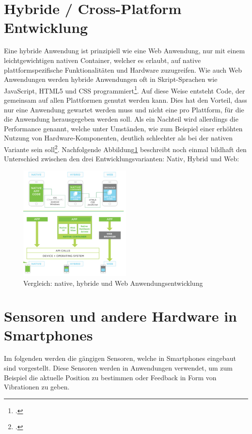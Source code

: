 \section{Hybride / Cross-Platform Entwicklung}

Eine hybride Anwendung ist prinzipiell wie eine Web Anwendung, nur mit einem leichtgewichtigen nativen Container, welcher es erlaubt, auf native plattformspezifische Funktionalitäten und Hardware zuzugreifen. Wie auch Web Anwendungen werden hybride Anwendungen oft in Skript-Sprachen wie JavaScript, HTML5 und CSS programmiert\footcite{Varianten}. Auf diese Weise entsteht Code, der gemeinsam auf allen Plattformen genutzt werden kann. Dies hat den Vorteil, dass nur eine Anwendung gewartet werden muss und nicht eine pro Plattform, für die die Anwendung herausgegeben werden soll. Als ein Nachteil wird allerdings die Performance genannt, welche unter Umständen, wie zum Beispiel einer erhöhten Nutzung von Hardware-Komponenten, deutlich schlechter als bei der nativen Variante sein soll\footcite{Varianten}. Nachfolgende Abbildung\ref{fig:VariantenAppEntwicklung} beschreibt noch einmal bildhaft den Unterschied zwischen den drei Entwicklungsvarianten: Nativ, Hybrid und Web: 

\begin{figure}[h]
	\centering
	\includegraphics[width=0.5\textwidth]{Bilder/Vergleich_Nativ_Hybrid.PNG}
	\caption{Vergleich: native, hybride und Web Anwendungsentwicklung}
	\label{fig:VariantenAppEntwicklung}
\end{figure}

\section{Sensoren und andere Hardware in Smartphones}

Im folgenden werden die gängigen Sensoren, welche in Smartphones eingebaut sind vorgestellt. Diese Sensoren werden in Anwendungen verwendet, um zum Beispiel die aktuelle Position zu bestimmen oder Feedback in Form von Vibrationen zu geben. 

